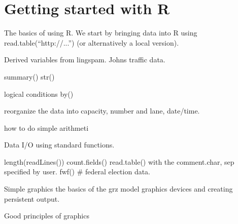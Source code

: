 
\section{Getting started with R}

The basics of using R.  We start by bringing data into R using
read.table(``http://...'')  (or alternatively a local version).

Derived variables from lingspam.
Johns traffic data.

summary()
str()

logical conditions
by()

reorganize the data into capacity, number and lane, date/time.

how to do simple arithmeti


Data I/O using standard functions.

length(readLines())
count.fields()
read.table() with the comment.char, sep specified by user.
fwf()  # federal election data.

Simple graphics
  the basics of the grz model
  graphics devices and creating persistent output.

  Good principles of graphics

